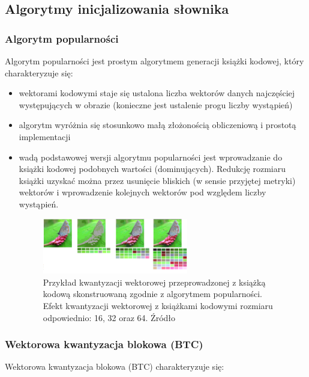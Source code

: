 \documentclass{article}
\begin{document}
\subsection{Algorytmy inicjalizowania słownika}

\subsubsection{Algorytm popularności}

Algorytm popularności jest prostym algorytmem generacji książki kodowej, który charakteryzuje się:

\begin{itemize}
  \item wektorami kodowymi staje się ustalona liczba wektorów danych najczęściej występujących w obrazie (konieczne jest ustalenie progu liczby wystąpień) 
  \item algorytm wyróżnia się stosunkowo małą złożonością obliczeniową i prostotą implementacji 
  \item wadą podstawowej wersji algorytmu popularności jest wprowadzanie do książki kodowej podobnych wartości (dominujących). Redukcję rozmiaru książki uzyskać można przez usunięcie bliskich (w sensie przyjętej metryki) wektorów i wprowadzenie kolejnych wektorów pod względem liczby wystąpień. 

\begin{figure}[H]
    \centering
    \includegraphics[width=0.6\textwidth]{images/motyle_2.png}
    \caption{Przykład kwantyzacji wektorowej przeprowadzonej z książką kodową skonstruowaną zgodnie z algorytmem popularności. Efekt kwantyzacji wektorowej z książkami kodowymi
rozmiaru odpowiednio: 16, 32 oraz 64. Źródło \cite{aprzelaskowski}}
    \label{fig:crossing}
\end{figure}
 
\end{itemize}

\subsubsection{Wektorowa kwantyzacja blokowa (BTC)}

Wektorowa kwantyzacja blokowa (BTC) charakteryzuje się:
\end{document}
